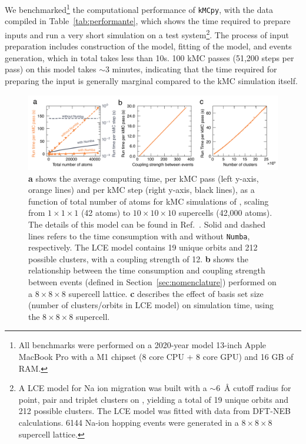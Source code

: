 \documentclass[a4paper,fleqn]{cas-dc}
\begin{document}
{We benchmarked\footnote{All benchmarks were performed on a 2020-year model 13-inch Apple MacBook Pro with  a M1 chipset (8 core CPU + 8 core GPU) and 16 GB of RAM.\label{fn:hardware}} the computational performance of \texttt{kMCpy}, with the data compiled in Table~\ref{tab:performante}, which shows the time required to prepare inputs and run a very short simulation on a test system\footnote{A LCE model for Na ion migration was built with a $\sim$6~\AA{} cutoff radius for point, pair and triplet clusters on , yielding a total of 19 unique orbits and 212 possible clusters. The LCE model was fitted with data from DFT-NEB calculations. 6144 Na-ion hopping events were generated in a $8\times8\times8$ supercell lattice\label{fn:model_details}.}.  The process of input preparation includes construction of the model, fitting of the model, and events generation, which in total takes less than 10s. 100 kMC passes (51,200 steps per pass) on this model takes $\sim$3 minutes, indicating that the time required for preparing the input is generally marginal compared to the kMC simulation itself. 

\begin{figure}[!ht]
    \centering
    \includegraphics[width=1\textwidth]{Figures/scalability.pdf}
    \caption{{\bf a} shows the average computing time, per kMC pass (left y-axis, orange lines) and per kMC step (right y-axis, black lines), as a function of total number of atoms for kMC simulations of , scaling from $1\times1\times1$ (42 atoms) to $10\times10\times10$ supercells (42,000 atoms). The details of this model can be found in Ref.~\cite{deng_fundamental_2022}. Solid and dashed lines refers to the time consumption with and without \texttt{Numba}, respectively. The LCE model contains 19 unique orbits and 212 possible clusters, with a coupling strength of 12.  \textbf{b} shows the relationship between the time consumption and coupling strength between events (defined in Section~\ref{sec:nomenclature}) performed on a $8\times8\times8$ supercell lattice.  \textbf{c} describes the effect of basis set size (number of clusters/orbits in LCE model) on simulation time, using the $8\times8\times8$ supercell.}   
    \label{fig:performance}
\end{figure}

}
\end{document}
